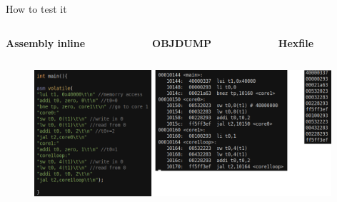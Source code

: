 \begin{frame}{How to test it}
\begin{columns}[T]
    \begin{column}{0.4\textwidth}
	\textbf{Assembly inline}
    \end{column}
    \begin{column}{0.3\textwidth}
	\textbf{OBJDUMP}
    \end{column}
    \begin{column}{0.1\textwidth}
	\textbf{Hexfile}
    \end{column}
\end{columns}
\vspace{-0.5cm}
\begin{figure}
    \centering
    \includegraphics[width=11cm]{images/coding.png}
    \label{fig:my_label}
\end{figure}


\end{frame}


